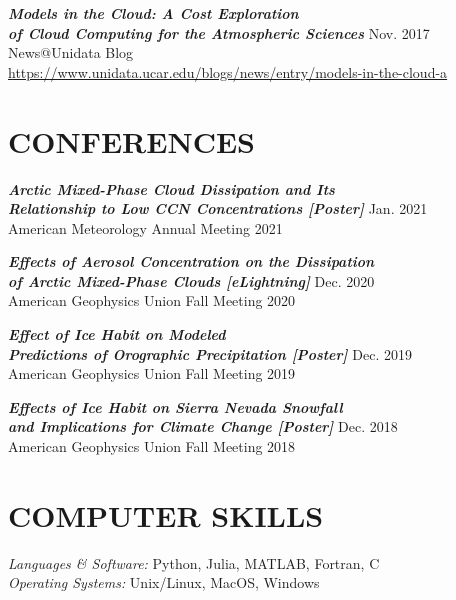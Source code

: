 \documentclass[overlapped]{res}
\begin{document}
\begin{resume}


                
                {\sl \textbf{Models in the Cloud: A Cost Exploration \\ of Cloud Computing for the Atmospheric Sciences}} \hfill Nov. 2017 \\
                News@Unidata Blog \\
                \href{https://www.unidata.ucar.edu/blogs/news/entry/models-in-the-cloud-a}{https://www.unidata.ucar.edu/blogs/news/entry/models-in-the-cloud-a}


\section{CONFERENCES}

                {\sl \textbf{Arctic Mixed-Phase Cloud Dissipation and Its \\ Relationship to Low CCN Concentrations [Poster]}} \hfill Jan. 2021\\
                American Meteorology Annual Meeting 2021

                {\sl \textbf{Effects of Aerosol Concentration  on the Dissipation \\ of Arctic Mixed-Phase Clouds  [eLightning]}} \hfill Dec. 2020 \\
                American Geophysics Union Fall Meeting 2020
                
                {\sl \textbf{Effect of Ice Habit on Modeled \\ Predictions of Orographic Precipitation [Poster]}} \hfill Dec. 2019 \\
                American Geophysics Union Fall Meeting 2019

                {\sl \textbf{Effects of Ice Habit on Sierra Nevada Snowfall \\ and Implications for Climate Change [Poster]}} \hfill Dec. 2018 \\
                American Geophysics Union Fall Meeting 2018
                
                \section{COMPUTER SKILLS} 
                {\sl Languages \& Software:} Python, Julia, MATLAB, Fortran, C \\
                {\sl Operating Systems:} Unix/Linux, MacOS, Windows


\end{resume}
\end{document}
